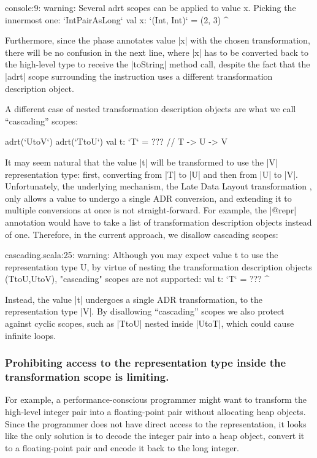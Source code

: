 \begin{lstlisting-nobreak}
console:9:  warning: Several adrt scopes can be applied to value x. Picking the innermost one: `IntPairAsLong`
val x: `(Int, Int)` = (2, 3)
          ^
\end{lstlisting-nobreak}

Furthermore, since the \inject{} phase annotates value |x| with the chosen transformation, there will be no confusion in the next line, where |x| has to be converted back to the high-level type to receive the |toString| method call, despite the fact that the |adrt| scope surrounding the instruction uses a different transformation description object.

A different case of nested transformation description objects are what we call ``cascading'' scopes:

\begin{lstlisting-nobreak}
adrt(`UtoV`) {
  adrt(`TtoU`) {
    val t: `T` = ??? // T -> U -> V
  }
}
\end{lstlisting-nobreak}

It may seem natural that the value |t| will be transformed to use the |V| representation type: first, converting from |T| to |U| and then from |U| to |V|. Unfortunately, the underlying mechanism, the Late Data Layout transformation \cite{ldl}, only allows a value to undergo a single ADR conversion, and extending it to multiple conversions at once is not straight-forward. For example, the |@repr| annotation would have to take a list of transformation description objects instead of one. Therefore, in the current approach, we disallow cascading scopes:

\begin{lstlisting-nobreak}
cascading.scala:25:  warning: Although you may expect value t to use the representation type U, by virtue of nesting the transformation description objects (TtoU,UtoV), "cascading" scopes are not supported:
val t: `T` = ???
         ^
\end{lstlisting-nobreak}

Instead, the value |t| undergoes a single ADR transformation, to the representation type |V|. By disallowing ``cascading'' scopes we also protect against cyclic scopes, such as |TtoU| nested inside |UtoT|, which could cause infinite loops.

\subsubsection{Prohibiting access to the representation type inside the transformation scope is limiting.} For example, a per\-for\-mance-conscious programmer might want to transform the high-level integer pair into a floating-point pair without allocating heap objects. Since the programmer does not have direct access to the representation, it looks like the only solution is to decode the integer pair into a heap object, convert it to a floating-point pair and encode it back to the long integer.

